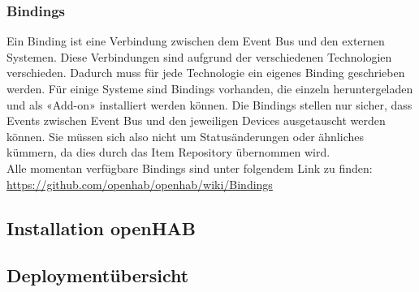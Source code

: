 \subsubsection{Bindings}
Ein Binding ist eine Verbindung zwischen dem Event Bus und den externen Systemen. Diese Verbindungen sind aufgrund der verschiedenen Technologien verschieden. Dadurch muss für jede Technologie ein eigenes Binding geschrieben werden. Für einige Systeme sind Bindings vorhanden, die einzeln heruntergeladen und als «Add-on» installiert werden können.
Die Bindings stellen nur sicher, dass Events zwischen Event Bus und den jeweiligen Devices ausgetauscht werden können. Sie müssen sich also nicht um Statusänderungen oder ähnliches kümmern, da dies durch das Item Repository übernommen wird. \\
Alle momentan verfügbare Bindings sind unter folgendem Link zu finden: \url{https://github.com/openhab/openhab/wiki/Bindings}

\pagebreak

\subsection{Installation openHAB}



\subsection{Deploymentübersicht}

